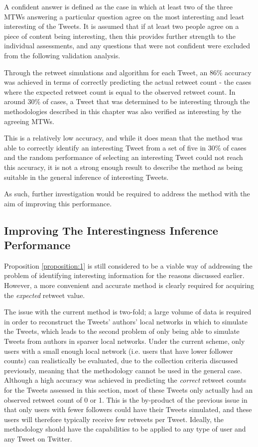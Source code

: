 A confident answer is defined as the case in which at least two of the three MTWs answering a particular question agree on the most interesting and least interesting of the Tweets. It is assumed that if at least two people agree on a piece of content being interesting, then this provides further strength to the individual assessments, and any questions that were not confident were excluded from the following validation analysis.

Through the retweet simulations and algorithm for each Tweet, an 86\% accuracy was achieved in terms of correctly predicting the actual retweet count - the cases where the expected retweet count is equal to the observed retweet count. In around 30\% of cases, a Tweet that was determined to be interesting through the methodologies described in this chapter was also verified as interesting by the agreeing MTWs.

This is a relatively low accuracy, and while it does mean that the method was able to correctly identify an interesting Tweet from a set of five in 30\% of cases and the random performance of selecting an interesting Tweet could not reach this accuracy, it is not a strong enough result to describe the method as being suitable in the general inference of interesting Tweets. 

As such, further investigation would be required to address the method with the aim of improving this performance.


\subsection{Improving The Interestingness Inference Performance}
Proposition \ref{proposition:1} is still considered to be a viable way of addressing the problem of identifying interesting information for the reasons discussed earlier. However, a more convenient and accurate method is clearly required for acquiring the \textit{expected} retweet value.

The issue with the current method is two-fold; a large volume of data is required in order to reconstruct the Tweets' authors' local networks in which to simulate the Tweets, which leads to the second problem of only being able to simulate Tweets from authors in sparser local networks. Under the current scheme, only users with a small enough local network (i.e. users that have lower follower counts) can realistically be evaluated, due to the collection criteria discussed previously, meaning that the methodology cannot be used in the general case. Although a high accuracy was achieved in predicting the \textit{correct} retweet counts for the Tweets assessed in this section, most of these Tweets only actually had an observed retweet count of 0 or 1. This is the by-product of the previous issue in that only users with fewer followers could have their Tweets simulated, and these users will therefore typically receive few retweets per Tweet. Ideally, the methodology should have the capabilities to be applied to any type of user and any Tweet on Twitter.

